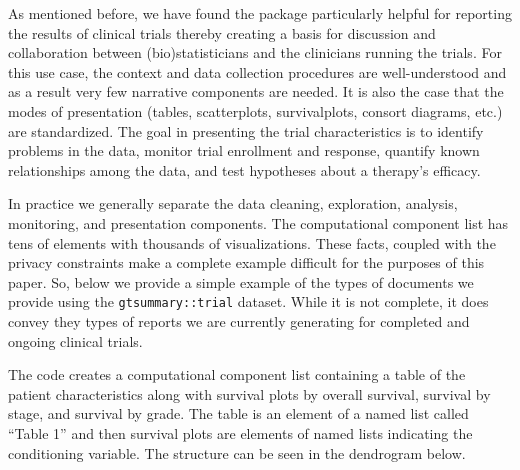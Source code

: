 \documentclass[
]{jss}
\begin{document}
\label{sect:simple-example}

As mentioned before, we have found the  package
particularly helpful for reporting the results of clinical trials
thereby creating a basis for discussion and collaboration between
(bio)statisticians and the clinicians running the trials. For this use
case, the context and data collection procedures are well-understood and
as a result very few narrative components are needed. It is also the
case that the modes of presentation (tables, scatterplots,
survivalplots, consort diagrams, etc.) are standardized. The goal in
presenting the trial characteristics is to identify problems in the
data, monitor trial enrollment and response, quantify known
relationships among the data, and test hypotheses about a therapy's
efficacy.

In practice we generally separate the data cleaning, exploration,
analysis, monitoring, and presentation components. The computational
component list has tens of elements with thousands of visualizations.
These facts, coupled with the privacy constraints make a complete
example difficult for the purposes of this paper. So, below we provide a
simple example of the types of documents we provide using the
\texttt{gtsummary::trial} dataset. While it is not complete, it does
convey they types of reports we are currently generating for completed
and ongoing clinical trials.

The code creates a computational component list containing a table of
the patient characteristics along with survival plots by overall
survival, survival by stage, and survival by grade. The table is an
element of a named list called ``Table 1'' and then survival plots are
elements of named lists indicating the conditioning variable. The
structure can be seen in the dendrogram below.
\end{document}
